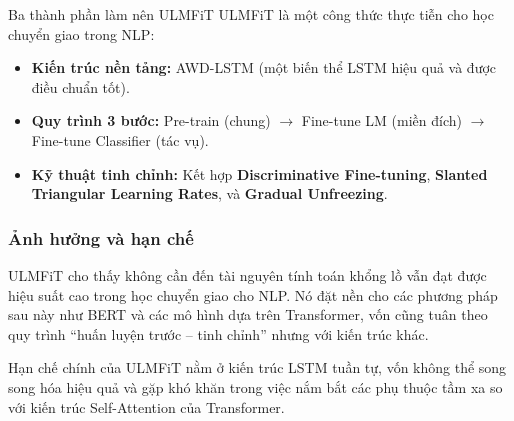 \begin{assess}{Ba thành phần làm nên ULMFiT}
ULMFiT là một công thức thực tiễn cho học chuyển giao trong NLP:
\begin{itemize}
    \item \textbf{Kiến trúc nền tảng:} AWD-LSTM (một biến thể LSTM hiệu quả và được điều chuẩn tốt).
    \item \textbf{Quy trình 3 bước:} Pre-train (chung) $\rightarrow$ Fine-tune LM (miền đích) $\rightarrow$ Fine-tune Classifier (tác vụ).
    \item \textbf{Kỹ thuật tinh chỉnh:} Kết hợp \textbf{Discriminative Fine-tuning}, \textbf{Slanted Triangular Learning Rates}, và \textbf{Gradual Unfreezing}.
\end{itemize}
\end{assess}

\subsubsection{Ảnh hưởng và hạn chế}
ULMFiT cho thấy không cần đến tài nguyên tính toán khổng lồ vẫn đạt được hiệu suất cao trong học chuyển giao cho NLP. Nó đặt nền cho các phương pháp sau này như BERT và các mô hình dựa trên Transformer, vốn cũng tuân theo quy trình “huấn luyện trước -- tinh chỉnh” nhưng với kiến trúc khác.

Hạn chế chính của ULMFiT nằm ở kiến trúc LSTM tuần tự, vốn không thể song song hóa hiệu quả và gặp khó khăn trong việc nắm bắt các phụ thuộc tầm xa so với kiến trúc Self-Attention của Transformer.

